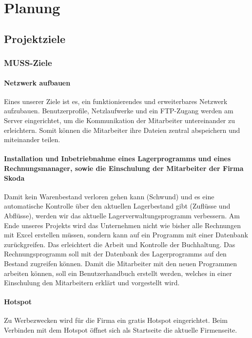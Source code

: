 \chapter{Planung}
\section{Projektziele}
\subsection{MUSS-Ziele}

\subsubsection{Netzwerk aufbauen}
Eines unserer Ziele ist es, ein funktionierendes und erweiterbares Netzwerk aufzubauen. Benutzerprofile, Netzlaufwerke und ein FTP-Zugang werden am Server eingerichtet, um die Kommunikation der Mitarbeiter untereinander zu erleichtern. Somit k\"onnen die Mitarbeiter ihre Dateien zentral abspeichern und miteinander teilen.

\subsubsection{Installation und Inbetriebnahme eines Lagerprogramms und eines Rechnungsmanager, sowie die Einschulung der Mitarbeiter der Firma Skoda}
Damit kein Warenbestand verloren gehen kann (Schwund) und es eine automatische Kontrolle \"uber den aktuellen Lagerbestand gibt (Zufl\"usse und Abfl\"usse), werden wir das aktuelle Lagerverwaltungsprogramm verbessern. Am Ende unseres Projekts wird das Unternehmen nicht wie bisher alle Rechnungen mit Excel erstellen m\"ussen, sondern kann auf ein Programm mit einer Datenbank zur\"uckgreifen. Das erleichtert die Arbeit und Kontrolle der Buchhaltung. Das Rechnungsprogramm soll mit der Datenbank des Lagerprogramms auf den Bestand zugreifen k\"onnen.
Damit die Mitarbeiter mit den neuen Programmen arbeiten k\"onnen, soll ein Benutzerhandbuch erstellt werden, welches in einer Einschulung den Mitarbeitern erkl\"art und vorgestellt wird.

\subsubsection{Hotspot}
Zu Werbezwecken wird f\"ur die Firma ein gratis Hotspot eingerichtet. Beim Verbinden mit dem Hotspot \"offnet sich als Startseite die aktuelle Firmenseite. 


